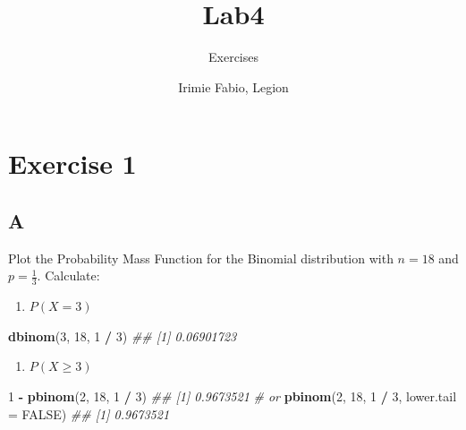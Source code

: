 \documentclass[
]{article}
\title{Lab4}
\subtitle{Exercises}
\author{Irimie Fabio, Legion}
\date{}
\newenvironment{Shaded}{\begin{snugshade}}{\end{snugshade}}
\newcommand{\CommentTok}[1]{\textcolor[rgb]{0.56,0.35,0.01}{\textit{#1}}}
\newcommand{\DataTypeTok}[1]{\textcolor[rgb]{0.13,0.29,0.53}{#1}}
\newcommand{\DecValTok}[1]{\textcolor[rgb]{0.00,0.00,0.81}{#1}}
\newcommand{\KeywordTok}[1]{\textcolor[rgb]{0.13,0.29,0.53}{\textbf{#1}}}
\newcommand{\NormalTok}[1]{#1}
\newcommand{\OperatorTok}[1]{\textcolor[rgb]{0.81,0.36,0.00}{\textbf{#1}}}
\newcommand{\OtherTok}[1]{\textcolor[rgb]{0.56,0.35,0.01}{#1}}
\newcommand{\StringTok}[1]{\textcolor[rgb]{0.31,0.60,0.02}{#1}}
\providecommand{\tightlist}{%
  \setlength{\itemsep}{0pt}\setlength{\parskip}{0pt}}
\begin{document}
\maketitle

{
\setcounter{tocdepth}{2}
\tableofcontents
}
\hypertarget{exercise-1}{%
\section{Exercise 1}\label{exercise-1}}

\hypertarget{a}{%
\subsection{A}\label{a}}

Plot the Probability Mass Function for the Binomial distribution with
\(n=18\) and \(p=\frac{1}{3}\). Calculate:

\begin{enumerate}
\def\labelenumi{\arabic{enumi}.}
\tightlist
\item
  \(P(X=3)\)
\end{enumerate}

\begin{Shaded}
\begin{Highlighting}[]
\KeywordTok{dbinom}\NormalTok{(}\DecValTok{3}\NormalTok{, }\DecValTok{18}\NormalTok{, }\DecValTok{1} \OperatorTok{/}\StringTok{ }\DecValTok{3}\NormalTok{)}
\CommentTok{\#\# [1] 0.06901723}
\end{Highlighting}
\end{Shaded}

\begin{enumerate}
\def\labelenumi{\arabic{enumi}.}
\setcounter{enumi}{1}
\tightlist
\item
  \(P(X \ge 3)\)
\end{enumerate}

\begin{Shaded}
\begin{Highlighting}[]
\DecValTok{1} \OperatorTok{{-}}\StringTok{ }\KeywordTok{pbinom}\NormalTok{(}\DecValTok{2}\NormalTok{, }\DecValTok{18}\NormalTok{, }\DecValTok{1} \OperatorTok{/}\StringTok{ }\DecValTok{3}\NormalTok{)}
\CommentTok{\#\# [1] 0.9673521}
\CommentTok{\# or}
\KeywordTok{pbinom}\NormalTok{(}\DecValTok{2}\NormalTok{, }\DecValTok{18}\NormalTok{, }\DecValTok{1} \OperatorTok{/}\StringTok{ }\DecValTok{3}\NormalTok{, }\DataTypeTok{lower.tail =} \OtherTok{FALSE}\NormalTok{)}
\CommentTok{\#\# [1] 0.9673521}
\end{Highlighting}
\end{Shaded}
\end{document}
